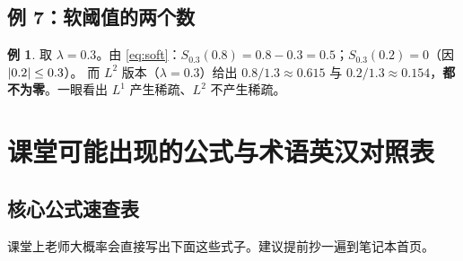\documentclass[UTF8,a4paper,11pt]{ctexart}
\theoremstyle{definition}
\newtheorem{example}[definition]{例}
\theoremstyle{plain}
\theoremstyle{remark}
\DeclarePairedDelimiter{\abs}{\lvert}{\rvert}
\begin{document}
\subsection{例 7：软阈值的两个数}

\begin{example}
取 $\lambda=0.3$。由 \eqref{eq:soft}：$S_{0.3}(0.8)=0.8-0.3=0.5$；$S_{0.3}(0.2)=0$（因 $\abs{0.2}\le0.3$）。
而 $L^2$ 版本（$\lambda=0.3$）给出 $0.8/1.3\approx0.615$ 与 $0.2/1.3\approx0.154$，\textbf{都不为零}。一眼看出 $L^1$ 产生稀疏、$L^2$ 不产生稀疏。
\end{example}

\section{课堂可能出现的公式与术语英汉对照表}\label{sec:glossary}

\subsection{核心公式速查表}

课堂上老师大概率会直接写出下面这些式子。建议提前抄一遍到笔记本首页。
\end{document}
